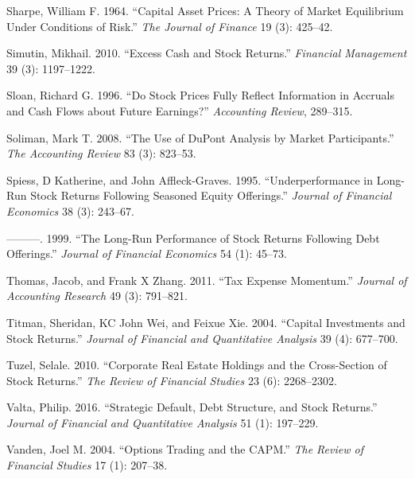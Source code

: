 \documentclass[
  letterpaper,
  DIV=11,
  numbers=noendperiod]{scrreprt}
\newlength{\cslhangindent}
\newlength{\cslentryspacingunit} %
\newenvironment{CSLReferences}[2] %
 {%
  \setlength{\parindent}{0pt}
  \ifodd #1
  \let\oldpar\par
  \def\par{\hangindent=\cslhangindent\oldpar}
  \fi
  \setlength{\parskip}{#2\cslentryspacingunit}
 }%
 {}
\begin{document}
\begin{CSLReferences}{1}{0}
\leavevmode{}%
Sharpe, William F. 1964. {``Capital Asset Prices: A Theory of Market
Equilibrium Under Conditions of Risk.''} \emph{The Journal of Finance}
19 (3): 425--42.

\leavevmode{}%
Simutin, Mikhail. 2010. {``Excess Cash and Stock Returns.''}
\emph{Financial Management} 39 (3): 1197--1222.

\leavevmode{}%
Sloan, Richard G. 1996. {``Do Stock Prices Fully Reflect Information in
Accruals and Cash Flows about Future Earnings?''} \emph{Accounting
Review}, 289--315.

\leavevmode{}%
Soliman, Mark T. 2008. {``The Use of DuPont Analysis by Market
Participants.''} \emph{The Accounting Review} 83 (3): 823--53.

\leavevmode{}%
Spiess, D Katherine, and John Affleck-Graves. 1995. {``Underperformance
in Long-Run Stock Returns Following Seasoned Equity Offerings.''}
\emph{Journal of Financial Economics} 38 (3): 243--67.

\leavevmode{}%
---------. 1999. {``The Long-Run Performance of Stock Returns Following
Debt Offerings.''} \emph{Journal of Financial Economics} 54 (1): 45--73.

\leavevmode{}%
Thomas, Jacob, and Frank X Zhang. 2011. {``Tax Expense Momentum.''}
\emph{Journal of Accounting Research} 49 (3): 791--821.

\leavevmode{}%
Titman, Sheridan, KC John Wei, and Feixue Xie. 2004. {``Capital
Investments and Stock Returns.''} \emph{Journal of Financial and
Quantitative Analysis} 39 (4): 677--700.

\leavevmode{}%
Tuzel, Selale. 2010. {``Corporate Real Estate Holdings and the
Cross-Section of Stock Returns.''} \emph{The Review of Financial
Studies} 23 (6): 2268--2302.

\leavevmode{}%
Valta, Philip. 2016. {``Strategic Default, Debt Structure, and Stock
Returns.''} \emph{Journal of Financial and Quantitative Analysis} 51
(1): 197--229.

\leavevmode{}%
Vanden, Joel M. 2004. {``Options Trading and the CAPM.''} \emph{The
Review of Financial Studies} 17 (1): 207--38.


\end{CSLReferences}
\end{document}
